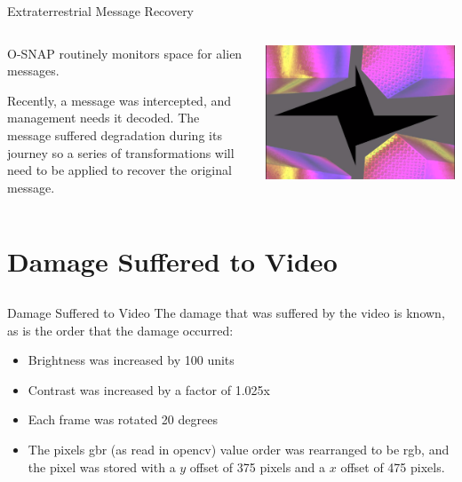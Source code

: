 \documentclass[xcolor=dvipsnames]{beamer}
\begin{document}
			\begin{frame}{Extraterrestrial Message Recovery}
				\begin{columns}
					\begin{column}{0.5\textwidth}
							O-SNAP routinely monitors space for alien messages. \newline
							
							Recently, a message was intercepted, and management needs it decoded. The message suffered degradation during its journey so a series of transformations will need to be applied to recover the original message. 
					\end{column}
					\begin{column}{0.5\textwidth}
						\includegraphics[width=\textwidth]{images/alteredVideoFrame}
					\end{column}
				\end{columns}
			\end{frame}
		
		
	\section{Damage Suffered to Video} 
		\subsection{} 
			\begin{frame}{Damage Suffered to Video}
				The damage that was suffered by the video is known, as is the order that the damage occurred:
				\begin{itemize}
					\item Brightness was increased by 100 units
					\item Contrast was increased by a factor of 1.025x
					\item Each frame was rotated 20 degrees
					\item The pixels gbr (as read in opencv) value order was rearranged to be rgb, and the pixel was stored with a $y$ offset of 375 pixels and a $x$ offset of 475 pixels.
				\end{itemize}
			\end{frame}
			
\end{document}
